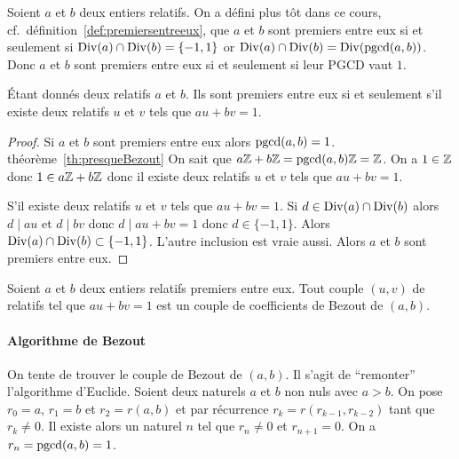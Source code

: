 Soient \(a\) et \(b\) deux entiers relatifs. On a défini plus tôt dans ce cours,
cf.\ définition~\ref{def:premiersentreeux}, que \(a\) et \(b\) sont premiers entre eux si et
seulement si \(\operatorname{Div}(a) \cap \operatorname{Div}(b)=\{-1,1\}\) or \(\operatorname{Div}(a) \cap \operatorname{Div}(b) =
\operatorname{Div}(\operatorname{pgcd}(a,b))\). Donc \(a\) et \(b\) sont premiers entre eux si et seulement
si leur PGCD vaut \(1\).

\begin{theo}
  Étant donnés deux relatifs \(a\) et \(b\). Ils sont premiers entre eux si et
  seulement s'il existe deux relatifs \(u\) et \(v\) tels que \(au+bv=1\).
\end{theo}
\begin{proof}
  Si \(a\) et \(b\) sont premiers entre eux alors \(\operatorname{pgcd}(a,b) =1\). %
  théorème~\ref{th:presqueBezout}
  On sait que \(a\mathbb{Z}+b\mathbb{Z}=\operatorname{pgcd}(a,b)\mathbb{Z}=\mathbb{Z}\). On a \(1 \in \mathbb{Z}\) donc \(1 \in
  a\mathbb{Z}+b\mathbb{Z}\) donc il existe deux relatifs \(u\) et \(v\) tels que \(au+bv=1\).

  S'il existe deux relatifs \(u\) et \(v\) tels que \(au+bv=1\). Si \(d \in
  \operatorname{Div}(a) \cap \operatorname{Div}(b)\) alors \(d \mid au\) et \(d \mid bv\) donc \(d \mid
  au+bv=1\) donc \(d \in \{-1,1\}\). Alors \(\operatorname{Div}(a) \cap \operatorname{Div}(b) \subset
  \{-1,1\}\). L'autre inclusion est vraie aussi. Alors \(a\) et \(b\) sont
  premiers entre eux.
\end{proof}

\begin{defdef}
  Soient \(a\) et \(b\) deux entiers relatifs premiers entre eux. Tout couple
  \((u,v)\) de relatifs tel que \(au+bv=1\) est un couple de coefficients de
  Bezout de \((a,b)\).
\end{defdef}

\paragraph{Algorithme de Bezout}

On tente de trouver le couple de Bezout de \((a,b)\). Il s'agit de ``remonter''
l'algorithme d'Euclide. Soient deux naturels \(a\) et \(b\) non nuls avec
\(a>b\). On pose \(r_0=a\), \(r_1=b\) et \(r_2=r(a,b)\) et par récurrence
\(r_k=r(r_{k-1}, r_{k-2})\) tant que \(r_k \neq 0\). Il existe alors un naturel
\(n\) tel que \(r_n \neq 0\) et \(r_{n+1}=0\). On a \(r_n=\operatorname{pgcd}(a,b)=1\).

